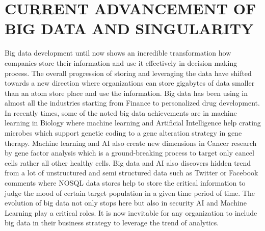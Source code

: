 \documentclass[sigconf]{acmart}
\begin{document}
\section{CURRENT ADVANCEMENT OF BIG DATA AND  SINGULARITY }
Big data development until now shows an incredible transformation how companies store their information and use it effectively in decision making process. The overall progression of storing and leveraging the data have shifted towards a new direction where organizations can store gigabytes of data smaller than an atom store place and use the information. Big data has been using in almost all the industries starting from Finance to personalized drug development.\cite{editor07} In recently times, some of the noted big data achievements are in machine learning in Biology where machine learning and Artificial Intelligence help crating microbes \cite{editor02} which support genetic coding to a gene alteration strategy in gene therapy. Machine learning and AI also create new dimensions in Cancer research by gene factor analysis which is a ground-breaking process to target only cancel cells rather all other healthy cells. Big data and AI also discovers hidden trend from a lot of unstructured and semi structured data such as Twitter or Facebook comments where NOSQL data stores help to store the critical information to judge the mood of certain target population in a given time period of time. The evolution of big data not only stops here but also in security AI and Machine Learning play a critical roles. \cite{editor02}It is now inevitable for any organization to include big data in their business strategy to leverage the trend of analytics.
\end{document}

